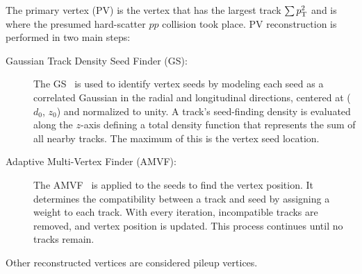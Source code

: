 The primary vertex (PV) is the vertex that has the largest track $\sum p_{\mathrm{T}}^{2}$ and is where the presumed hard-scatter $pp$ collision took place. PV reconstruction is performed in two main steps:
\begin{description}
  \item[Gaussian Track Density Seed Finder (GS):] The GS~\cite{ATLAS:2019jmx} is used to identify vertex seeds by modeling each seed as a correlated Gaussian in the radial and longitudinal directions, centered at ($d_{0}$, $z_{0}$) and normalized to unity. A track's seed-finding density is evaluated along the $z$-axis defining a total density function that represents the sum of all nearby tracks. The maximum of this is the vertex seed location.
  \item[Adaptive Multi-Vertex Finder (AMVF):] The AMVF~\cite{cms_AMVF} is applied to the seeds to find the vertex position. It determines the compatibility between a track and seed by assigning a weight to each track. With every iteration, incompatible tracks are removed, and vertex position is updated. This process continues until no tracks remain.
\end{description}
Other reconstructed vertices are considered pileup vertices.
